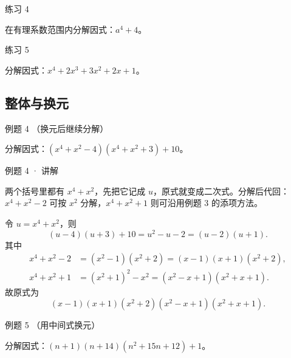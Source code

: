 \begin{problem}{练习 4}

在有理系数范围内分解因式：$a^4+4$。

\end{problem}

\begin{problem}{练习 5}

分解因式：$x^4+2x^3+3x^2+2x+1$。

\end{problem}


\subsection{整体与换元}



\begin{problem}{例题 4 （换元后继续分解）}

分解因式：$(x^4+x^2-4)(x^4+x^2+3)+10$。

\end{problem}


\begin{solution}{例题 4 · 讲解}

\think 两个括号里都有 $x^4+x^2$，先把它记成 $u$，原式就变成二次式。分解后代回：$x^4+x^2-2$ 可按 $x^2$ 分解，$x^4+x^2+1$ 则可沿用例题 3 的添项方法。

\solve 令 $u=x^4+x^2$，则
\[(u-4)(u+3)+10=u^2-u-2=(u-2)(u+1).\]
其中
\begin{align*}
x^4+x^2-2&=(x^2-1)(x^2+2)=(x-1)(x+1)(x^2+2),\\
x^4+x^2+1&=(x^2+1)^2-x^2=(x^2-x+1)(x^2+x+1).
\end{align*}
故原式为
\[(x-1)(x+1)(x^2+2)(x^2-x+1)(x^2+x+1).\]


\end{solution}


\begin{problem}{例题 5 （用中间式换元）}

分解因式：$(n+1)(n+14)(n^2+15n+12)+1$。

\end{problem}

